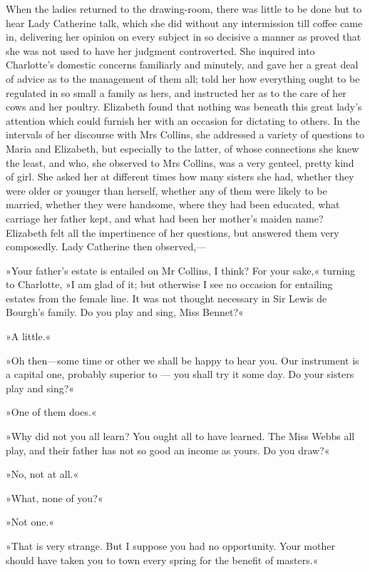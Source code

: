 When the ladies returned to the drawing-room, there was little to be done but to hear Lady Catherine talk, which she did without any intermission till coffee came in, delivering her opinion on every subject in so decisive a manner as proved that she was not used to have her judgment controverted. She inquired into Charlotte's domestic concerns familiarly and minutely, and gave her a great deal of advice as to the management of them all; told her how everything ought to be regulated in so small a family as hers, and instructed her as to the care of her cows and her poultry. Elizabeth found that nothing was beneath this great lady's attention which could furnish her with an occasion for dictating to others. In the intervals of her discourse with Mrs Collins, she addressed a variety of questions to Maria and Elizabeth, but especially to the latter, of whose connections she knew the least, and who, she observed to Mrs Collins, was a very genteel, pretty kind of girl. She asked her at different times how many sisters she had, whether they were older or younger than herself, whether any of them were likely to be married, whether they were handsome, where they had been educated, what carriage her father kept, and what had been her mother's maiden name? Elizabeth felt all the impertinence of her questions, but answered them very composedly. Lady Catherine then observed,—

»Your father's estate is entailed on Mr Collins, I think? For your sake,« turning to Charlotte, »I am glad of it; but otherwise I see no occasion for entailing estates from the female line. It was not thought necessary in Sir Lewis de Bourgh's family. Do you play and sing, Miss Bennet?«

»A little.«

»Oh then—some time or other we shall be happy to hear you. Our instrument is a capital one, probably superior to — you shall try it some day. Do your sisters play and sing?«

»One of them does.«

»Why did not you all learn? You ought all to have learned. The Miss Webbs all play, and their father has not so good an income as yours. Do you draw?«

»No, not at all.«

»What, none of you?«

»Not one.«

»That is very strange. But I suppose you had no opportunity. Your mother should have taken you to town every spring for the benefit of masters.«

